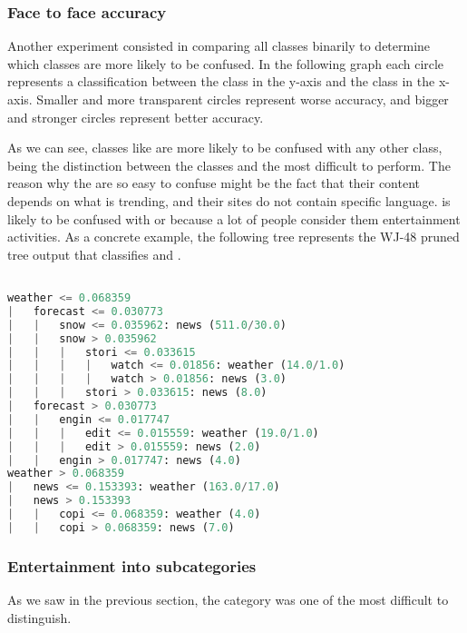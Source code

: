 \subsubsection{Face to face accuracy}
Another experiment consisted in comparing all classes binarily to determine which classes are more likely to be confused. In the following graph each circle represents a classification 
between the class in the y-axis and the class in the x-axis. Smaller and more transparent circles represent worse accuracy, and bigger and stronger circles represent better accuracy. 

As we can see, classes like  are more likely to be confused with any other class, being the distinction between the classes  and  the most
difficult to perform. The reason why the  are so easy to confuse might be the fact that their content depends on what is trending, and their sites do not contain specific language.
 is likely to be confused with  or  because a lot of people consider them entertainment activities. 
As a concrete example, the following tree represents the WJ-48 pruned tree output that classifies  and .

\begin{lstlisting}[language=Python]

weather <= 0.068359
|   forecast <= 0.030773
|   |   snow <= 0.035962: news (511.0/30.0)
|   |   snow > 0.035962
|   |   |   stori <= 0.033615
|   |   |   |   watch <= 0.01856: weather (14.0/1.0)
|   |   |   |   watch > 0.01856: news (3.0)
|   |   |   stori > 0.033615: news (8.0)
|   forecast > 0.030773
|   |   engin <= 0.017747
|   |   |   edit <= 0.015559: weather (19.0/1.0)
|   |   |   edit > 0.015559: news (2.0)
|   |   engin > 0.017747: news (4.0)
weather > 0.068359
|   news <= 0.153393: weather (163.0/17.0)
|   news > 0.153393
|   |   copi <= 0.068359: weather (4.0)
|   |   copi > 0.068359: news (7.0)
\end{lstlisting}

\subsubsection{Entertainment into subcategories}
As we saw in the previous section, the category  was one of the most difficult to distinguish. 

